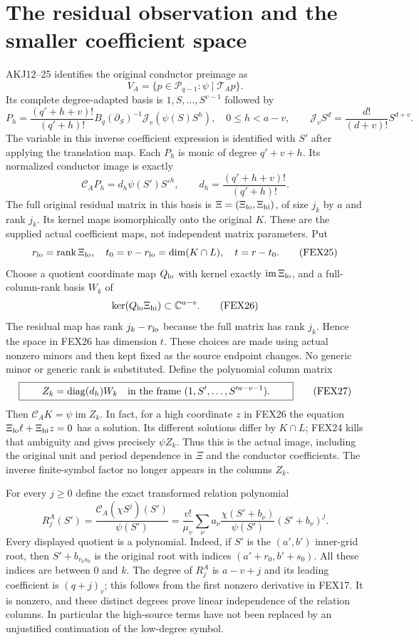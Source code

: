 \documentclass[11pt,a4paper]{article}
\begin{document}
\section{The residual observation and the smaller coefficient space}
\label{sec:FEX-residual}
AKJ12--25 identifies the original conductor preimage as
\[
 V_A=\{p\in\mathcal P_{q-1}:\psi\mid\mathcal T_Ap\}.
 \tag{FEX22}
\]
Its complete degree-adapted basis is $1,S,\ldots,S^{v-1}$ followed by
\[
 P_h=\frac{(q'+h+v)!}{(q'+h)!}
            B_q(\partial_S)^{-1}\mathcal J_v(\psi(S)S^h),
 \quad 0\le h<a-v,
 \qquad \mathcal J_vS^d=\frac{d!}{(d+v)!}S^{d+v}.
 \tag{FEX23}
\]
The variable in this inverse coefficient expression is identified with
$S'$ after applying the translation map. Each $P_h$ is monic of degree
$q'+v+h$. Its normalized conductor image is exactly
\[
 \mathcal C_AP_h=d_h\psi(S')S'^h,
 \qquad d_h=\frac{(q'+h+v)!}{(q'+h)!}.
 \tag{FEX24}
\]
The full original residual matrix in this basis is
$\Xi=(\Xi_{\rm lo},\Xi_{\rm hi})$, of size $j_k$ by $a$ and rank $j_k$.
Its kernel maps isomorphically onto the original $K$. These are the
supplied actual coefficient maps, not independent matrix parameters.
Put
\[
 r_{\rm lo}=\operatorname{rank}\Xi_{\rm lo},\quad
 t_0=v-r_{\rm lo}=\dim(K\cap L),\quad t=r-t_0.
 \tag{FEX25}
\]
Choose a quotient coordinate map $Q_{\rm lo}$ with kernel exactly
$\operatorname{im}\Xi_{\rm lo}$, and a full-column-rank basis $W_k$ of
\[
 \ker(Q_{\rm lo}\Xi_{\rm hi})\subset\mathbb C^{a-v}.
 \tag{FEX26}
\]
The residual map has rank $j_k-r_{\rm lo}$ because the full matrix has
rank $j_k$. Hence the space in FEX26 has dimension $t$. These choices
are made using actual nonzero minors and then kept fixed as the source
endpoint changes. No generic minor or generic rank is substituted.
Define the polynomial column matrix
\[
 \boxed{\qquad Z_k=\operatorname{diag}(d_h)W_k
             \quad\hbox{in the frame }(1,S',\ldots,S'^{a-v-1}).\qquad}
 \tag{FEX27}
\]
Then $\mathcal C_AK=\psi\operatorname{im}Z_k$. In fact, for a high
coordinate $z$ in FEX26 the equation
$\Xi_{\rm lo}\ell+\Xi_{\rm hi}z=0$ has a solution. Its different
solutions differ by $K\cap L$; FEX24 kills that ambiguity and gives
precisely $\psi Z_k$. Thus this is the actual image, including the
original unit and period dependence in $\Xi$ and the conductor
coefficients. The inverse finite-symbol factor no longer appears in the
columns $Z_k$.

For every $j\ge0$ define the exact transformed relation polynomial
\[
 \boxed{\quad
 R_j^A(S')=\frac{\mathcal C_A(\chi S^j)(S')}{\psi(S')}
 =\frac{v!}{\mu_v}\sum_\nu a_\nu
       \frac{\chi(S'+b_\nu)}{\psi(S')}(S'+b_\nu)^j.
 \quad}\tag{FEX28}
\]
Every displayed quotient is a polynomial. Indeed, if $S'$ is the
$(a',b')$ inner-grid root, then $S'+b_{r_0s_0}$ is the original root
with indices $(a'+r_0,b'+s_0)$. All these indices are between $0$ and $k$.
The degree of $R_j^A$ is $a-v+j$ and its leading coefficient is
$(q+j)_v$; this follows from the first nonzero derivative in FEX17.
It is nonzero, and these distinct degrees prove linear independence of
the relation columns. In particular the high-source terms have not
been replaced by an unjustified continuation of the low-degree symbol.
\end{document}

